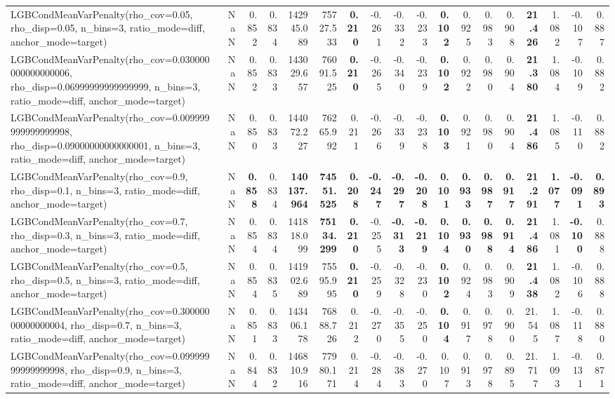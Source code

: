 \documentclass[11pt]{article}
\theoremstyle{plain}
\theoremstyle{definition}
\newcommand{\1}{\mathbf{1}}
\begin{document}
\begin{table}[htbp]
{\begin{tabular}{lrrrrrrrrrrrrrrrrr}
LGBCondMeanVarPenalty(rho\_cov=0.05, rho\_disp=0.05, n\_bins=3, ratio\_mode=diff, anchor\_mode=target) & NaN & 0.852 & 0.834 & 142945.089 & 75727.533 & \textbf{0.210} & -0.261 & -0.332 & -0.233 & \textbf{0.102} & 0.925 & 0.983 & 0.908 & \textbf{21.426} & 1.082 & -0.107 & 0.887 \\
LGBCondMeanVarPenalty(rho\_cov=0.030000000000000006, rho\_disp=0.06999999999999999, n\_bins=3, ratio\_mode=diff, anchor\_mode=target) & NaN & 0.852 & 0.833 & 143029.657 & 76091.525 & \textbf{0.210} & -0.265 & -0.340 & -0.239 & \textbf{0.102} & 0.922 & 0.980 & 0.904 & \textbf{21.380} & 1.084 & -0.109 & 0.882 \\
LGBCondMeanVarPenalty(rho\_cov=0.009999999999999998, rho\_disp=0.09000000000000001, n\_bins=3, ratio\_mode=diff, anchor\_mode=target) & NaN & 0.850 & 0.833 & 144072.227 & 76265.992 & 0.211 & -0.266 & -0.339 & -0.238 & \textbf{0.103} & 0.921 & 0.980 & 0.904 & \textbf{21.486} & 1.085 & -0.110 & 0.882 \\
LGBCondMeanVarPenalty(rho\_cov=0.9, rho\_disp=0.1, n\_bins=3, ratio\_mode=diff, anchor\_mode=target) & NaN & \textbf{0.858} & 0.834 & \textbf{140137.964} & \textbf{74551.525} & \textbf{0.208} & \textbf{-0.247} & \textbf{-0.297} & \textbf{-0.208} & \textbf{0.101} & \textbf{0.933} & \textbf{0.987} & \textbf{0.917} & \textbf{21.291} & \textbf{1.077} & \textbf{-0.091} & \textbf{0.893} \\
LGBCondMeanVarPenalty(rho\_cov=0.7, rho\_disp=0.3, n\_bins=3, ratio\_mode=diff, anchor\_mode=target) & NaN & 0.854 & 0.834 & 141818.099 & \textbf{75134.299} & \textbf{0.210} & -0.255 & \textbf{-0.313} & \textbf{-0.219} & \textbf{0.104} & \textbf{0.930} & \textbf{0.988} & \textbf{0.914} & \textbf{21.486} & 1.081 & \textbf{-0.100} & 0.888 \\
LGBCondMeanVarPenalty(rho\_cov=0.5, rho\_disp=0.5, n\_bins=3, ratio\_mode=diff, anchor\_mode=target) & NaN & 0.854 & 0.835 & 141902.689 & 75595.995 & \textbf{0.210} & -0.259 & -0.328 & -0.230 & \textbf{0.102} & 0.924 & 0.983 & 0.909 & \textbf{21.438} & 1.082 & -0.106 & 0.888 \\
LGBCondMeanVarPenalty(rho\_cov=0.30000000000000004, rho\_disp=0.7, n\_bins=3, ratio\_mode=diff, anchor\_mode=target) & NaN & 0.851 & 0.833 & 143406.178 & 76888.726 & 0.212 & -0.270 & -0.355 & -0.250 & \textbf{0.104} & 0.917 & 0.978 & 0.900 & 21.545 & 1.087 & -0.118 & 0.880 \\
LGBCondMeanVarPenalty(rho\_cov=0.09999999999999998, rho\_disp=0.9, n\_bins=3, ratio\_mode=diff, anchor\_mode=target) & NaN & 0.844 & 0.832 & 146810.916 & 77980.171 & 0.214 & -0.284 & -0.383 & -0.270 & 0.107 & 0.913 & 0.978 & 0.895 & 21.717 & 1.093 & -0.131 & 0.871 \\

\end{tabular}}
\end{table}
\end{document}
